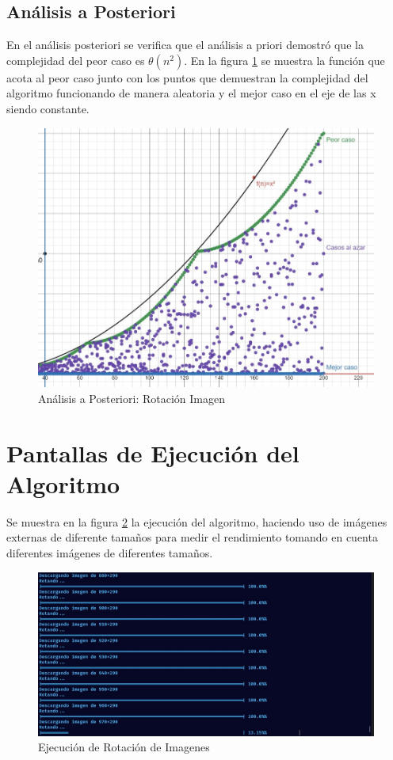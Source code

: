     \subsection{Análisis a Posteriori}
        En el análisis posteriori se verifica que el análisis a priori demostró que la complejidad del peor caso es \(\theta(n^{2})\). En la figura \ref{fig:posteriori1} se muestra la función que acota al peor caso junto con los puntos que demuestran la complejidad del algoritmo funcionando de manera aleatoria y el mejor caso en el eje de las x siendo constante. 
        \begin{figure}[htp!]
            \centering
            \includegraphics[width=1 \textwidth]{Images/A_Posteriori/posteriori.jpg}  
            \caption{Análisis a Posteriori: Rotación Imagen}
            \label{fig:posteriori1}
        \end{figure}
    
    
    
    \newpage
    \section{Pantallas de Ejecución del Algoritmo}
    Se muestra en la figura \ref{fig:rotas} la ejecución del algoritmo, haciendo uso de imágenes externas de diferente tamaños para medir el rendimiento tomando en cuenta diferentes imágenes de diferentes tamaños. 
    
        \begin{figure}[htp!]
            \centering
            \includegraphics[width=0.8 \textwidth]{Images/Pantallas/ejecucion.jpg}  
            \caption{Ejecución de Rotación de Imagenes}
            \label{fig:rotas}
        \end{figure}
    